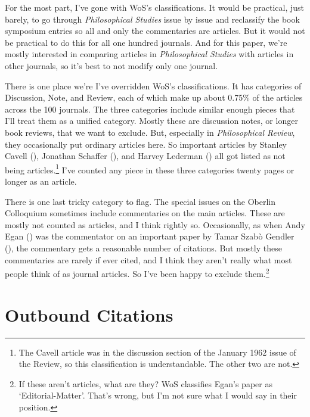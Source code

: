 \documentclass[
  11pt,
  letterpaper,
  DIV=11,
  numbers=noendperiod,
  twoside]{scrartcl}
\begin{document}
For the most part, I've gone with WoS's classifications. It would be
practical, just barely, to go through \emph{Philosophical Studies} issue
by issue and reclassify the book symposium entries so all and only the
commentaries are articles. But it would not be practical to do this for
all one hundred journals. And for this paper, we're mostly interested in
comparing articles in \emph{Philosophical Studies} with articles in
other journals, so it's best to not modify only one journal.

There is one place we're I've overridden WoS's classifications. It has
categories of Discussion, Note, and Review, each of which make up about
0.75\% of the articles across the 100 journals. The three categories
include similar enough pieces that I'll treat them as a unified
category. Mostly these are discussion notes, or longer book reviews,
that we want to exclude. But, especially in \emph{Philosophical Review},
they occasionally put ordinary articles here. So important articles by
Stanley Cavell (), Jonathan
Schaffer (), and Harvey Lederman
() all got listed as not being
articles.\footnote{The Cavell article was in the discussion section of
  the January 1962 issue of the Review, so this classification is
  understandable. The other two are not.} I've counted any piece in
these three categories twenty pages or longer as an article.

There is one last tricky category to flag. The special issues on the
Oberlin Colloquium sometimes include commentaries on the main articles.
These are mostly not counted as articles, and I think rightly so.
Occasionally, as when Andy Egan () was the
commentator on an important paper by Tamar Szabò Gendler
(), the commentary gets a
reasonable number of citations. But mostly these commentaries are rarely
if ever cited, and I think they aren't really what most people think of
as journal articles. So I've been happy to exclude them.\footnote{If
  these aren't articles, what are they? WoS classifies Egan's paper as
  `Editorial-Matter'. That's wrong, but I'm not sure what I would say in
  their position.}

\section{Outbound Citations}\label{sec-outbound}
\end{document}
